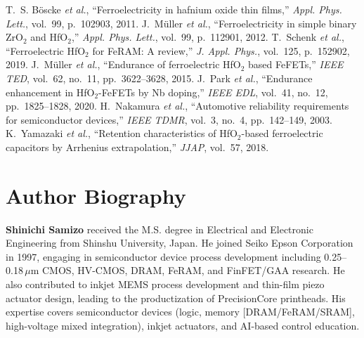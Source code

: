 \documentclass[journal]{IEEEtran}
\begin{document}
\begin{thebibliography}{9}
 T.~S. Böscke \emph{et al.}, ``Ferroelectricity in hafnium oxide thin films,'' \emph{Appl. Phys. Lett.}, vol.~99, p.~102903, 2011.
 J.~Müller \emph{et al.}, ``Ferroelectricity in simple binary ZrO$_2$ and HfO$_2$,'' \emph{Appl. Phys. Lett.}, vol.~99, p.~112901, 2012.
 T.~Schenk \emph{et al.}, ``Ferroelectric HfO$_2$ for FeRAM: A review,'' \emph{J. Appl. Phys.}, vol.~125, p.~152902, 2019.
 J.~Müller \emph{et al.}, ``Endurance of ferroelectric HfO$_2$ based FeFETs,'' \emph{IEEE TED}, vol.~62, no.~11, pp.~3622--3628, 2015.
 J.~Park \emph{et al.}, ``Endurance enhancement in HfO$_2$-FeFETs by Nb doping,'' \emph{IEEE EDL}, vol.~41, no.~12, pp.~1825--1828, 2020.
 H.~Nakamura \emph{et al.}, ``Automotive reliability requirements for semiconductor devices,'' \emph{IEEE TDMR}, vol.~3, no.~4, pp.~142--149, 2003.
 K.~Yamazaki \emph{et al.}, ``Retention characteristics of HfO$_2$-based ferroelectric capacitors by Arrhenius extrapolation,'' \emph{JJAP}, vol.~57, 2018.
\end{thebibliography}

\section*{Author Biography}
\textbf{Shinichi Samizo} received the M.S. degree in Electrical and Electronic Engineering from Shinshu University, Japan. He joined Seiko Epson Corporation in 1997, engaging in semiconductor device process development including 0.25--0.18\,$\mu$m CMOS, HV-CMOS, DRAM, FeRAM, and FinFET/GAA research. He also contributed to inkjet MEMS process development and thin-film piezo actuator design, leading to the productization of PrecisionCore printheads. His expertise covers semiconductor devices (logic, memory [DRAM/FeRAM/SRAM], high-voltage mixed integration), inkjet actuators, and AI-based control education.
\end{document}

